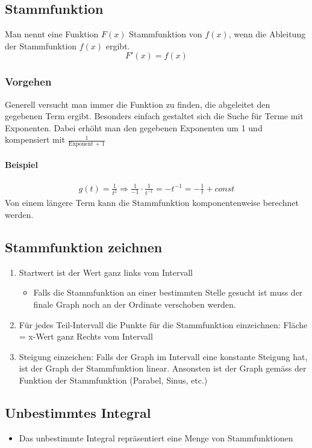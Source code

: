 \subsection{Stammfunktion}
Man nennt eine Funktion $F(x)$ Stammfunktion von $f(x)$, wenn die Ableitung der Stammfunktion $f(x)$ ergibt. 
\[F'(x) = f(x)\]

\subsubsection{Vorgehen}
Generell versucht man immer die Funktion zu finden, die abgeleitet den gegebenen Term ergibt. Besonders einfach gestaltet sich die Suche für Terme mit Exponenten. Dabei erhöht man den gegebenen Exponenten um 1 und kompensiert mit $\frac{1}{\text{Exponent + 1}}$
\paragraph{Beispiel}
\begin{align*}
	g(t) = \frac{1}{t^2} \Rightarrow \frac{1}{-1} \cdot \frac{1}{t^{-1}} = -t^{-1} = -\frac{1}{t} + const
\end{align*}
Von einem längere Term kann die Stammfunktion komponentenweise berechnet werden.

\subsection{Stammfunktion zeichnen}
\begin{enumerate}
	\item Startwert ist der Wert ganz links vom Intervall
	\begin{itemize}
		\item Falls die Stammfunktion an einer bestimmten Stelle gesucht ist muss der finale Graph noch an der Ordinate verschoben werden.
	\end{itemize}
	\item Für jedes Teil-Intervall die Punkte für die Stammfunktion einzeichnen: Fläche = x-Wert ganz Rechts vom Intervall
	\item Steigung einzeichen: Falls der Graph im Intervall eine konstante Steigung hat, ist der Graph der Stammfunktion linear. Ansonsten ist der Graph gemäss der Funktion der Stammfunktion (Parabel, Sinus, etc.)
\end{enumerate}

\subsection{Unbestimmtes Integral}
\begin{itemize}
	\item Das unbestimmte Integral repräsentiert eine Menge von Stammfunktionen
\end{itemize}
